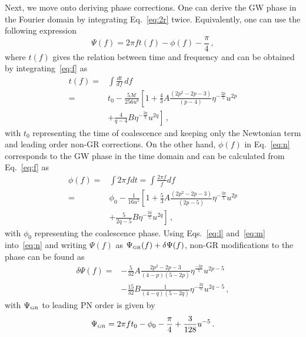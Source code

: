 \documentclass[prd,twocolumn,nofootinbib]{revtex4-1}
\newcommand{\GR}{{\mbox{\tiny GR}}}
\begin{document}
Next, we move onto deriving phase corrections. One can derive the GW phase in the Fourier domain by integrating Eq.~\eqref{eq:2r} twice. Equivalently, one can use the following expression
\begin{equation}\label{eq:n}
\Psi(f)=2\pi f t(f)-\phi(f)-\frac{\pi}{4}\,,
\end{equation}
where $t(f)$ gives the relation between time and frequency and can be obtained by integrating~\eqref{eq:f} as
\begin{align}\label{eq:l}
t(f)=&\int \frac{dt}{df} \, df\nonumber\\=&t_0 -\frac{5 \mathcal{M}}{256 u^8}\left[1+\frac{4}{3}A\frac{\left(2 p^2-2 p-3\right)}{(p-4)}\eta ^{-\frac{2 p}{5}} u^{2 p}\right.\nonumber\\ &\left. +\frac{4}{q-4}B\eta ^{-\frac{2q}{5}} u^{2q}\right]\,,
\end{align}
with $t_0$ representing the time of coalescence and keeping only the Newtonian term and leading order non-GR corrections. On the other hand, $\phi(f)$ in Eq.~\eqref{eq:n} corresponds to the GW phase in the time domain and can be calculated from Eq.~\eqref{eq:f} as
\begin{align}\label{eq:m}
\phi(f)=&\int 2 \pi f dt=\int\frac{2\pi f}{\dot{f}}df\nonumber\\
=&\phi_0 -\frac{1}{16 u^5}\left[1+\frac{5}{3}A\frac{\left(2 p^2-2 p-3\right)}{(2 p-5)} \eta ^{-\frac{2 p}{5}} u^{2 p}\right. \nonumber \\
& \left. +\frac{5}{2 q-5}B\eta ^{-\frac{2 q}{5}} u^{2 q}\right]\,,
\end{align}
with $\phi_0$ representing the coalescence phase. Using Eqs.~\eqref{eq:l} and~\eqref{eq:m} into~\eqref{eq:n} and writing $\Psi(f)$ as $\Psi_{\GR}(f)+\delta\Psi(f)$, non-GR modifications to the phase can be found as
 \begin{align}\label{eq:p2}
\delta\Psi(f)=&-\frac{5}{32}A\frac{2p^2-2p-3}{(4-p)(5-2p)}\eta^{\frac{-2p}{5}}u^{2p-5}\nonumber\\ &-\frac{15}{32}B\frac{1}{(4-q)(5-2q)}\eta^{-\frac{2q}{5}}u^{2q-5}\,,
 \end{align}
with $\Psi_{\GR}$ to leading PN order is given by~\cite{Blanchet:1995ez}
\begin{equation}
\label{eq:Psi_GR}
\Psi_{\GR}=2\pi f t_0-\phi_0-\frac{\pi}{4}+\frac{3}{128}u^{-5}\,.
\end{equation}
\end{document}
